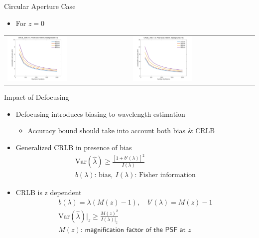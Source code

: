 \documentclass[t]{beamer}
\begin{document}
\begin{frame}{
    Circular Aperture Case
}
    \begin{itemize}
        \item For $z=0$ 
    \end{itemize}
    \centering
    \begin{tabular}{C{0.45\textwidth} C{0.45\textwidth}}
        \includegraphics[width=0.5\textwidth]{SaveFilex} &
        \includegraphics[width=0.5\textwidth]{SaveFilel} \\
    \end{tabular}
\end{frame}

\begin{frame}{
    Impact of Defocusing 
}
    \begin{itemize}
        \item Defocusing introduces biasing to wavelength estimation 
    \begin{itemize}
        \item Accuracy bound should take into account both bias \& CRLB
    \end{itemize}
        \item Generalized CRLB in presence of bias
            \begin{gather*}
                \textrm{Var}(\hat{\lambda})\geq\frac{\left[1+b'(\lambda)\right]^2}{I(\lambda)}\\
                b(\lambda)\text{: bias},\: I(\lambda)\text{: Fisher information}
            \end{gather*}
        \item CRLB is z dependent
            \begin{gather*}
                b(\lambda) = \lambda(M(z)-1),\quad b'(\lambda) = M(z)-1\\
                \textrm{Var}(\hat{\lambda})|_{z}\geq\frac{M(z)^2}{I(\lambda)|_{z}}\\
                M(z)\textsf{: magnification factor of the PSF at $z$}
            \end{gather*}
    \end{itemize}
\end{frame}
\end{document}
